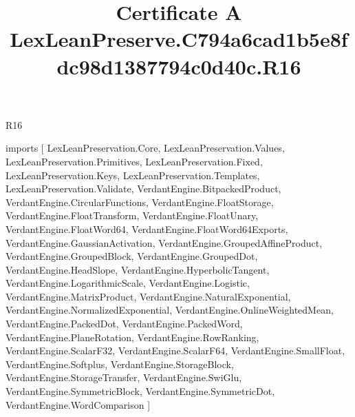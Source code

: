 \begin{lexlean}{R16}
\title{Certificate A LexLeanPreserve.C794a6cad1b5e8fdc98d1387794c0d40c.R16}
\begin{coremodule}
imports [
  LexLeanPreservation.Core,
  LexLeanPreservation.Values,
  LexLeanPreservation.Primitives,
  LexLeanPreservation.Fixed,
  LexLeanPreservation.Keys,
  LexLeanPreservation.Templates,
  LexLeanPreservation.Validate,
  VerdantEngine.BitpackedProduct,
  VerdantEngine.CircularFunctions,
  VerdantEngine.FloatStorage,
  VerdantEngine.FloatTransform,
  VerdantEngine.FloatUnary,
  VerdantEngine.FloatWord64,
  VerdantEngine.FloatWord64Exports,
  VerdantEngine.GaussianActivation,
  VerdantEngine.GroupedAffineProduct,
  VerdantEngine.GroupedBlock,
  VerdantEngine.GroupedDot,
  VerdantEngine.HeadSlope,
  VerdantEngine.HyperbolicTangent,
  VerdantEngine.LogarithmicScale,
  VerdantEngine.Logistic,
  VerdantEngine.MatrixProduct,
  VerdantEngine.NaturalExponential,
  VerdantEngine.NormalizedExponential,
  VerdantEngine.OnlineWeightedMean,
  VerdantEngine.PackedDot,
  VerdantEngine.PackedWord,
  VerdantEngine.PlaneRotation,
  VerdantEngine.RowRanking,
  VerdantEngine.ScalarF32,
  VerdantEngine.ScalarF64,
  VerdantEngine.SmallFloat,
  VerdantEngine.Softplus,
  VerdantEngine.StorageBlock,
  VerdantEngine.StorageTransfer,
  VerdantEngine.SwiGlu,
  VerdantEngine.SymmetricBlock,
  VerdantEngine.SymmetricDot,
  VerdantEngine.WordComparison
]


\end{coremodule}
\end{lexlean}
